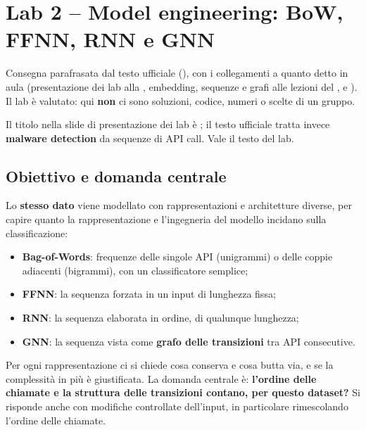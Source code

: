 \chapter{Lab 2 -- Model engineering: BoW, FFNN, RNN e GNN}
\label{cap:lab2}

\begin{nota}
Consegna parafrasata dal testo ufficiale (), con i collegamenti a
quanto detto in aula (presentazione dei lab alla , embedding, sequenze e grafi
alle lezioni del ,  e ).
Il lab è valutato: qui \textbf{non} ci sono soluzioni, codice, numeri o scelte di un gruppo.
\end{nota}

\begin{verifica}
Il titolo nella slide di presentazione dei lab è ; il testo
ufficiale tratta invece \textbf{malware detection} da sequenze di API call. Vale il testo del lab.
\end{verifica}

\section{Obiettivo e domanda centrale}
Lo \textbf{stesso dato} viene modellato con rappresentazioni e architetture diverse, per capire
quanto la rappresentazione e l'ingegneria del modello incidano sulla classificazione:
\begin{itemize}
  \item \textbf{Bag-of-Words}: frequenze delle singole API (unigrammi) o delle coppie adiacenti
        (bigrammi), con un classificatore semplice;
  \item \textbf{FFNN}: la sequenza forzata in un input di lunghezza fissa;
  \item \textbf{RNN}: la sequenza elaborata in ordine, di qualunque lunghezza;
  \item \textbf{GNN}: la sequenza vista come \textbf{grafo delle transizioni} tra API consecutive.
\end{itemize}
Per ogni rappresentazione ci si chiede cosa conserva e cosa butta via, e se la complessità in più
è giustificata. La domanda centrale è: \textbf{l'ordine delle chiamate e la struttura delle
transizioni contano, per questo dataset?} Si risponde anche con modifiche controllate dell'input,
in particolare rimescolando l'ordine delle chiamate.

